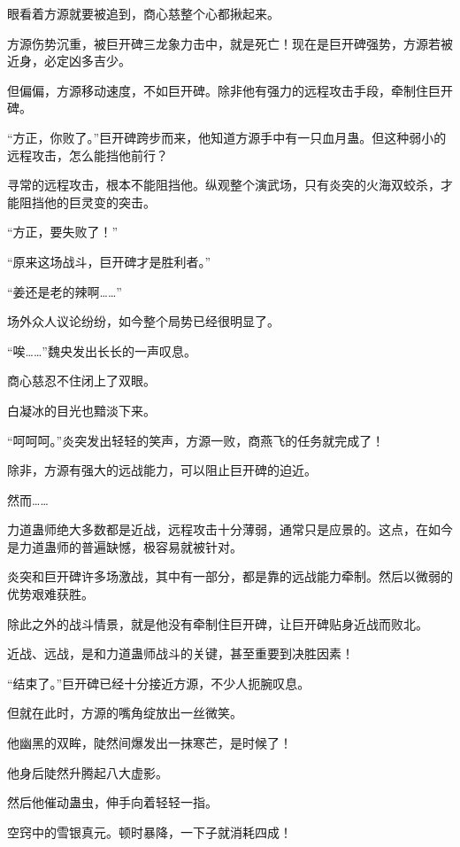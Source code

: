 
\begin{this_body}

眼看着方源就要被追到，商心慈整个心都揪起来。

方源伤势沉重，被巨开碑三龙象力击中，就是死亡！现在是巨开碑强势，方源若被近身，必定凶多吉少。

但偏偏，方源移动速度，不如巨开碑。除非他有强力的远程攻击手段，牵制住巨开碑。

“方正，你败了。”巨开碑跨步而来，他知道方源手中有一只血月蛊。但这种弱小的远程攻击，怎么能挡他前行？

寻常的远程攻击，根本不能阻挡他。纵观整个演武场，只有炎突的火海双蛟杀，才能阻挡他的巨灵变的突击。

“方正，要失败了！”

“原来这场战斗，巨开碑才是胜利者。”

“姜还是老的辣啊……”

场外众人议论纷纷，如今整个局势已经很明显了。

“唉……”魏央发出长长的一声叹息。

商心慈忍不住闭上了双眼。

白凝冰的目光也黯淡下来。

“呵呵呵。”炎突发出轻轻的笑声，方源一败，商燕飞的任务就完成了！

除非，方源有强大的远战能力，可以阻止巨开碑的迫近。

然而……

力道蛊师绝大多数都是近战，远程攻击十分薄弱，通常只是应景的。这点，在如今是力道蛊师的普遍缺憾，极容易就被针对。

炎突和巨开碑许多场激战，其中有一部分，都是靠的远战能力牵制。然后以微弱的优势艰难获胜。

除此之外的战斗情景，就是他没有牵制住巨开碑，让巨开碑贴身近战而败北。

近战、远战，是和力道蛊师战斗的关键，甚至重要到决胜因素！

“结束了。”巨开碑已经十分接近方源，不少人扼腕叹息。

但就在此时，方源的嘴角绽放出一丝微笑。

他幽黑的双眸，陡然间爆发出一抹寒芒，是时候了！

他身后陡然升腾起八大虚影。

然后他催动蛊虫，伸手向着轻轻一指。

空窍中的雪银真元。顿时暴降，一下子就消耗四成！


\end{this_body}
